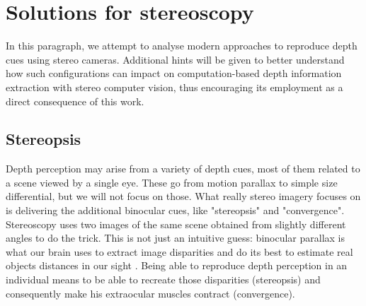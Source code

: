 \section{Solutions for stereoscopy}

In this paragraph, we attempt to analyse modern approaches to reproduce depth cues using stereo cameras. Additional hints will be given to better understand how such configurations can impact on computation-based depth information extraction with stereo computer vision, thus encouraging its employment as a direct consequence of this work.

\subsection{Stereopsis}
Depth perception may arise from a variety of depth cues, most of them related to a scene viewed by a single eye. These go from motion parallax to simple size differential, but we will not focus on those. What really stereo imagery focuses on is delivering the additional binocular cues, like "stereopsis" and "convergence". Stereoscopy uses two images of the same scene obtained from slightly different angles to do the trick. This is not just an intuitive guess: binocular parallax is what our brain uses to extract image disparities and do its best to estimate real objects distances in our sight \cite{disparity_depth}. Being able to reproduce depth perception in an individual means to be able to recreate those disparities (stereopsis) and consequently make his extraocular muscles contract (convergence).

